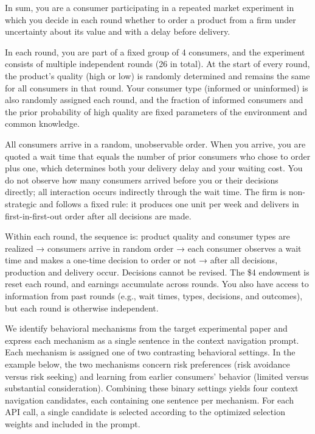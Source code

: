 \documentclass[12pt,letterpaper]{article}
\begin{document}
\begin{tcolorbox}[
    colback=white,
    colframe=black,
    colbacktitle=white,
    coltitle=black,
    boxrule=0.5pt,
    arc=2mm,
    left=3mm,
    right=3mm,
    top=2mm,
    bottom=2mm,
    fonttitle=\large\bfseries,
    title={Context Formation for
        \textcolor{red!70!black}{Kremer and Debo (2016)}}
]
\ttfamily
In sum, you are a consumer participating in a repeated market experiment in which you decide in each round whether to order a product from a firm under uncertainty about its value and with a delay before delivery.

In each round, you are part of a fixed group of 4 consumers, and the experiment consists of multiple independent rounds (26 in total). At the start of every round, the product's quality (high or low) is randomly determined and remains the same for all consumers in that round. Your consumer type (informed or uninformed) is also randomly assigned each round, and the fraction of informed consumers and the prior probability of high quality are fixed parameters of the environment and common knowledge.

All consumers arrive in a random, unobservable order. When you arrive, you are quoted a wait time that equals the number of prior consumers who chose to order plus one, which determines both your delivery delay and your waiting cost. You do not observe how many consumers arrived before you or their decisions directly; all interaction occurs indirectly through the wait time. The firm is non-strategic and follows a fixed rule: it produces one unit per week and delivers in first-in-first-out order after all decisions are made.

Within each round, the sequence is: product quality and consumer types are realized → consumers arrive in random order → each consumer observes a wait time and makes a one-time decision to order or not → after all decisions, production and delivery occur. Decisions cannot be revised. The \$4 endowment is reset each round, and earnings accumulate across rounds. You also have access to information from past rounds (e.g., wait times, types, decisions, and outcomes), but each round is otherwise independent.

\end{tcolorbox}

We identify behavioral mechanisms from the target experimental
paper and express each mechanism as a single sentence in the
context navigation prompt. Each mechanism is assigned one of two
contrasting behavioral settings. In the example below, the two
mechanisms concern risk preferences (risk avoidance versus risk
seeking) and learning from earlier consumers' behavior (limited
versus substantial consideration). Combining these binary settings
yields four context navigation candidates, each containing one
sentence per mechanism. For each API call, a single candidate is
selected according to the optimized selection weights and included
in the prompt.
\end{document}
